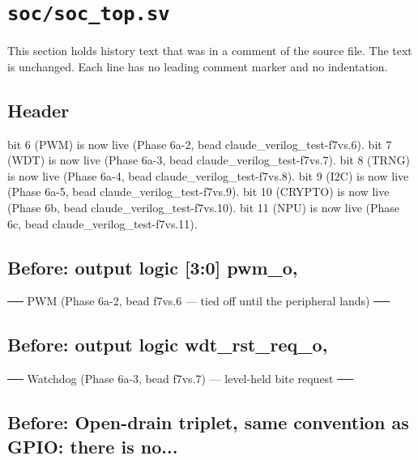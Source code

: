 \section{\texttt{soc/soc\_top.sv}}\label{cr:mod:soc-top}

This section holds history text that was in a comment of the source file. The text is unchanged. Each line has no leading comment marker and no indentation.

\begin{record}

\subsection*{Header}

\begin{textblock}
    bit 6 (PWM) is now live (Phase 6a-2, bead claude_verilog_test-f7vs.6).
    bit 7 (WDT) is now live (Phase 6a-3, bead claude_verilog_test-f7vs.7).
    bit 8 (TRNG) is now live (Phase 6a-4, bead claude_verilog_test-f7vs.8).
    bit 9 (I2C) is now live (Phase 6a-5, bead claude_verilog_test-f7vs.9).
    bit 10 (CRYPTO) is now live (Phase 6b, bead claude_verilog_test-f7vs.10).
    bit 11 (NPU) is now live (Phase 6c, bead claude_verilog_test-f7vs.11).
\end{textblock}

\subsection*{Before: output logic [3:0]  pwm\_o,}

\begin{textblock}
── PWM (Phase 6a-2, bead f7vs.6 — tied off until the peripheral lands) ──
\end{textblock}

\subsection*{Before: output logic        wdt\_rst\_req\_o,}

\begin{textblock}
── Watchdog (Phase 6a-3, bead f7vs.7) — level-held bite request ──
\end{textblock}

\subsection*{Before: Open-drain triplet, same convention as GPIO: there is no...}


\end{record}
